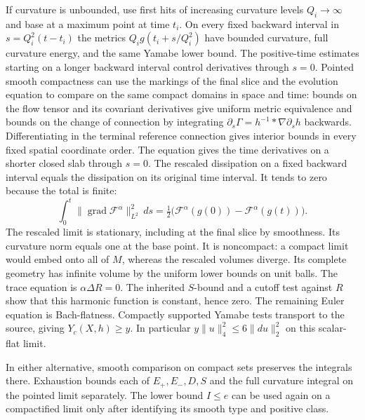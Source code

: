\documentclass[11pt,letterpaper]{article}
\newcommand{\F}{\mathcal F}
\begin{document}
If curvature is unbounded, use first hits of increasing curvature
levels \(Q_i\to\infty\) and base at a maximum point at time \(t_i\).
On every fixed backward interval in \(s=Q_i^2(t-t_i)\) the metrics
\(Q_i g(t_i+s/Q_i^2)\) have bounded curvature, full curvature energy,
and the same Yamabe lower bound. The positive-time estimates starting
on a longer backward interval control derivatives through \(s=0\).
Pointed smooth compactness can use the markings of the final slice
and the evolution equation to compare on the same compact domains in
space and time: bounds on the flow tensor and its covariant derivatives
give uniform metric equivalence and bounds on the change of connection
by integrating \(\partial_s\Gamma=h^{-1}*\nabla\partial_s h\) backwards.
Differentiating in the terminal reference connection gives interior
bounds in every fixed spatial coordinate order. The equation gives
the time derivatives on a shorter closed slab through \(s=0\). The rescaled dissipation on a fixed backward interval
equals the dissipation on its original time interval. It tends to
zero because the total is finite:
\[
 \int_0^t\|\operatorname{grad}\F^\alpha\|_{L^2}^2\,ds
   =\tfrac12\big(\F^\alpha(g(0))-\F^\alpha(g(t))\big).
\]
The rescaled limit is stationary, including at the final slice by
smoothness. Its curvature norm equals one at the base point. It is
noncompact: a compact limit would embed onto all of \(M\), whereas
the rescaled volumes diverge. Its complete geometry has infinite
volume by the uniform lower bounds on unit balls. The trace equation
is \(\alpha\Delta R=0\). The inherited \(S\)-bound and a cutoff
test against \(R\) show that this harmonic function is constant,
hence zero. The remaining Euler equation is Bach-flatness.
Compactly supported Yamabe tests transport to the source, giving
\(Y_c(X,h)\ge y\). In particular \(y\|u\|_4^2\le6\|du\|_2^2\)
on this scalar-flat limit.

In either alternative, smooth comparison on compact sets preserves
the integrals there. Exhaustion bounds each of \(E_+,E_-,D,S\) and
the full curvature integral on the pointed limit separately. The
lower bound \(I\le e\) can be used again on a compactified limit only
after identifying its smooth type and positive class.
\end{document}
